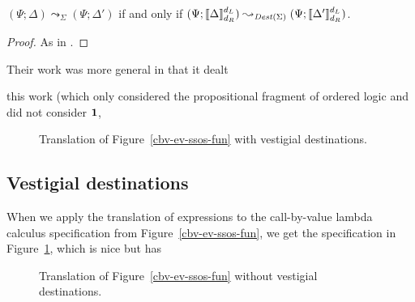 

\bigskip
\begin{theorem}~\\\label{thm:destcorrect}
$(\Psi; \Delta) \leadsto_\Sigma (\Psi; \Delta')$ if and only if
$(\Psi; \llbracket \Delta \rrbracket^{d_L}_{d_R}) \leadsto_{{\it Dest}(\Sigma)}
 (\Psi; \llbracket \Delta' \rrbracket^{d_L}_{d_R})$.
\end{theorem}

\begin{proof}
As in \cite[Appendix A]{simmons11logical}.
\end{proof}

Their work was more general
in that it dealt 

 this work (which only
considered the propositional fragment of ordered logic and did not
consider $\mathbf{1}$, 


\begin{figure}
\caption{Translation of Figure~\ref{cbv-ev-ssos-fun} with vestigial destinations.}
\label{fig:dest-vestige}
\end{figure}

\subsection{Vestigial destinations}

When we apply the translation of expressions to the call-by-value 
lambda calculus specification from Figure~\ref{cbv-ev-ssos-fun}, we get
the specification in Figure~\ref{fig:dest-vestige}, which is nice but
has 

\begin{figure}
\caption{Translation of Figure~\ref{cbv-ev-ssos-fun} without vestigial destinations.}
\label{fig:dest-cbv}
\end{figure}


